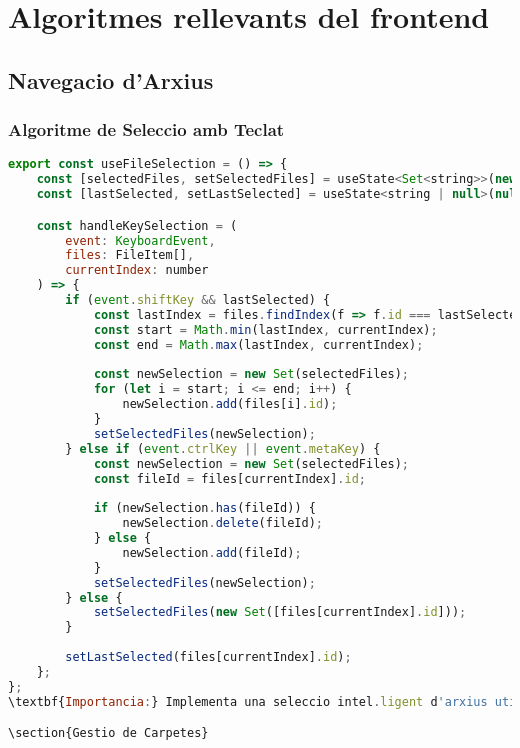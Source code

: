 
\chapter{Algoritmes rellevants del frontend}

\section{Navegacio d'Arxius}

\subsection{Algoritme de Seleccio amb Teclat}
\begin{lstlisting}[language=JavaScript]
export const useFileSelection = () => {
    const [selectedFiles, setSelectedFiles] = useState<Set<string>>(new Set());
    const [lastSelected, setLastSelected] = useState<string | null>(null);

    const handleKeySelection = (
        event: KeyboardEvent,
        files: FileItem[],
        currentIndex: number
    ) => {
        if (event.shiftKey && lastSelected) {
            const lastIndex = files.findIndex(f => f.id === lastSelected);
            const start = Math.min(lastIndex, currentIndex);
            const end = Math.max(lastIndex, currentIndex);
            
            const newSelection = new Set(selectedFiles);
            for (let i = start; i <= end; i++) {
                newSelection.add(files[i].id);
            }
            setSelectedFiles(newSelection);
        } else if (event.ctrlKey || event.metaKey) {
            const newSelection = new Set(selectedFiles);
            const fileId = files[currentIndex].id;
            
            if (newSelection.has(fileId)) {
                newSelection.delete(fileId);
            } else {
                newSelection.add(fileId);
            }
            setSelectedFiles(newSelection);
        } else {
            setSelectedFiles(new Set([files[currentIndex].id]));
        }
        
        setLastSelected(files[currentIndex].id);
    };
};
\textbf{Importancia:} Implementa una seleccio intel.ligent d'arxius utilitzant tecles de fletxa, similar als exploradors de fitxers natius.

\section{Gestio de Carpetes}


\end{lstlisting}
